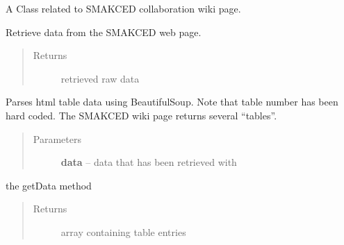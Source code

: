 \documentclass[letterpaper,10pt,english]{sphinxmanual}
\begin{document}

\begin{fulllineitems}
\label{SamPy.smakced:SamPy.smakced.getSmackedDataNoNumpy.Smakced}
A Class related to SMAKCED collaboration wiki page.


\begin{fulllineitems}
\label{SamPy.smakced:SamPy.smakced.getSmackedDataNoNumpy.Smakced.getData}
Retrieve data from the SMAKCED web page.
\begin{quote}\begin{description}
\item[{Returns}] \leavevmode
retrieved raw data

\end{description}\end{quote}

\end{fulllineitems}



\begin{fulllineitems}
\label{SamPy.smakced:SamPy.smakced.getSmackedDataNoNumpy.Smakced.parseTable}
Parses html table data using BeautifulSoup.
Note that table number has been hard coded.
The SMAKCED wiki page returns several ``tables''.
\begin{quote}\begin{description}
\item[{Parameters}] \leavevmode
\textbf{data} -- data that has been retrieved with

\end{description}\end{quote}

the getData method
\begin{quote}\begin{description}
\item[{Returns}] \leavevmode
array containing table entries

\end{description}\end{quote}


\end{fulllineitems}
\end{fulllineitems}
\end{document}
